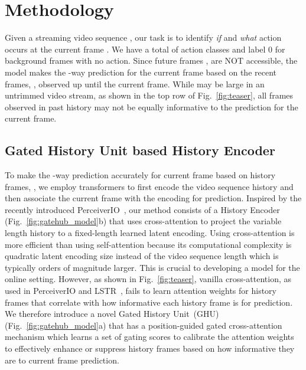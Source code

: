 \documentclass[10pt,twocolumn,letterpaper]{article}
\begin{document}
%
 \section{Methodology}

Given a streaming video sequence
,
our task is to identify \textit{if} and \textit{what} action  occurs at the current frame . We have a total of  action classes and label 0 for background frames with no action. Since future frames , are NOT accessible, the model makes the -way prediction for the current frame based on the recent  frames, , 
observed up until the current frame. While  may be large in an untrimmed video stream, as shown in the top row of Fig.~\ref{fig:teaser}, all frames observed in past history  may not be  equally informative to the prediction for the current frame.







\subsection{Gated History Unit based History Encoder}
To make the -way prediction accurately for current frame  based on  history frames, , we employ transformers to first encode the video sequence history and then associate the current frame with the encoding for prediction. Inspired by the recently introduced PerceiverIO~\cite{jaegle2021perceiverio}, our method consists of a History Encoder (Fig.~\ref{fig:gatehub_model}b) that uses cross-attention to project the variable length history to a fixed-length learned latent encoding. Using cross-attention is more efficient than using self-attention because its computational complexity is quadratic \wrt latent encoding size instead of the video sequence length which is typically orders of magnitude larger. This is crucial to developing a model for the online setting. However, as shown in Fig.~\ref{fig:teaser}, vanilla cross-attention, as used in PerceiverIO and LSTR~\cite{xu2021long}, fails to learn attention weights for history frames that correlate with how informative each history frame is for  prediction. 
We therefore introduce a novel Gated History Unit~(GHU) (Fig.~\ref{fig:gatehub_model}a) that has a position-guided gated cross-attention mechanism which learns a set of gating scores  to calibrate the attention weights to effectively enhance or suppress history frames based on how informative they are to current frame prediction. 
\end{document}
